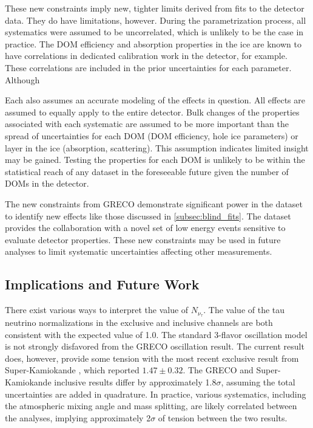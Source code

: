 These new constraints imply new, tighter limits derived from fits to the detector data.
They do have limitations, however.
During the parametrization process, all systematics were assumed to be uncorrelated, which is unlikely to be the case in practice.
The DOM efficiency and absorption properties in the ice are known to have correlations in dedicated calibration work in the detector, for example.
These correlations are included in the prior uncertainties for each parameter.
Although

Each also assumes an accurate modeling of the effects in question.
All effects are assumed to equally apply to the entire detector.
Bulk changes of the properties associated with each systematic are assumed to be more important than the spread of uncertainties for each DOM (DOM efficiency, hole ice parameters) or layer in the ice (absorption, scattering).
This assumption indicates limited insight may be gained.
Testing the properties for each DOM is unlikely to be within the statistical reach of any dataset in the foreseeable future given the number of DOMs in the detector.

The new constraints from GRECO demonstrate significant power in the dataset to identify new effects like those discussed in \ref{subsec:blind_fits}.
The dataset provides the collaboration with a novel set of low energy events sensitive to evaluate detector properties.
These new constraints may be used in future analyses to limit systematic uncertainties affecting other measurements.

\label{subsec:implications}
\subsection{Implications and Future Work}
There exist various ways to interpret the value of ${N_{\nu_\tau}}$. 
The value of the tau neutrino normalizations in the exclusive and inclusive channels  are both consistent with the expected value of 1.0.
The standard 3-flavor oscillation model is not strongly disfavored from the GRECO oscillation result.
The current result does, however, provide some tension with the most recent exclusive result from Super-Kamiokande , which reported ${1.47\pm0.32}$. 
The GRECO and Super-Kamiokande inclusive results differ by approximately 1.8${\sigma}$, assuming the total uncertainties are added in quadrature.
In practice, various systematics, including the atmospheric mixing angle and mass splitting, are likely correlated between the analyses, implying approximately 2${\sigma}$ of tension between the two results.

